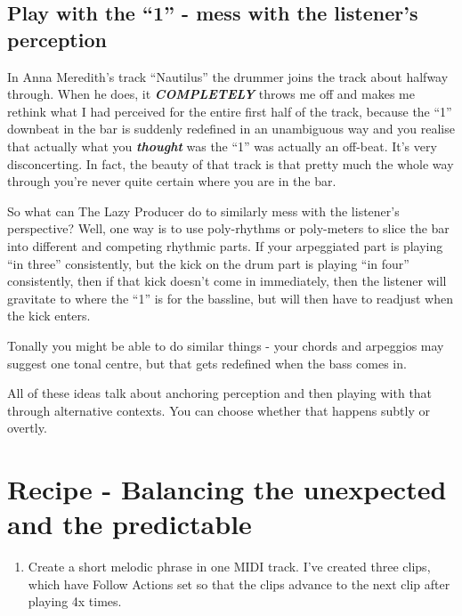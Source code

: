 \documentclass[
  12pt,
  letterpaper,
  oneside,
  open=any]{scrbook}
\providecommand{\tightlist}{%
  \setlength{\itemsep}{0pt}\setlength{\parskip}{0pt}}\usepackage{longtable,booktabs,array}
\begin{document}
\section{Play with the ``1'' - mess with the listener's
perception}\label{play-with-the-1---mess-with-the-listeners-perception}

In Anna Meredith's track ``Nautilus'' the drummer joins the track about
halfway through. When he does, it \textbf{\emph{COMPLETELY}} throws me
off and makes me rethink what I had perceived for the entire first half
of the track, because the ``1'' downbeat in the bar is suddenly
redefined in an unambiguous way and you realise that actually what you
\textbf{\emph{thought}} was the ``1'' was actually an off-beat. It's
very disconcerting. In fact, the beauty of that track is that pretty
much the whole way through you're never quite certain where you are in
the bar.

So what can The Lazy Producer do to similarly mess with the listener's
perspective? Well, one way is to use poly-rhythms or poly-meters to
slice the bar into different and competing rhythmic parts. If your
arpeggiated part is playing ``in three'' consistently, but the kick on
the drum part is playing ``in four'' consistently, then if that kick
doesn't come in immediately, then the listener will gravitate to where
the ``1'' is for the bassline, but will then have to readjust when the
kick enters.

Tonally you might be able to do similar things - your chords and
arpeggios may suggest one tonal centre, but that gets redefined when the
bass comes in.

All of these ideas talk about anchoring perception and then playing with
that through alternative contexts. You can choose whether that happens
subtly or overtly.


\chapter{Recipe - Balancing the unexpected and the
predictable}\label{Chapter-010-Recipe-Balance_random_and_predictable}

\begin{enumerate}
\def\labelenumi{\arabic{enumi}.}
\tightlist
\item
  Create a short melodic phrase in one MIDI track. I've created three
  clips, which have Follow Actions set so that the clips advance to the
  next clip after playing 4x times.
\end{enumerate}
\end{document}
